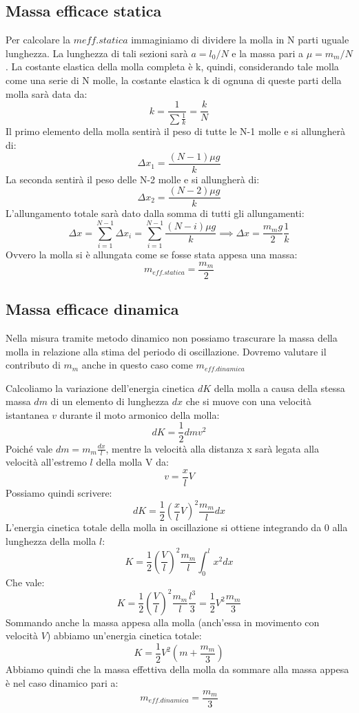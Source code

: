\documentclass[a4paper,12pt]{article}
\begin{document}
\subsection{Massa efficace statica}
Per calcolare la $m{eff.statica}$ immaginiamo di dividere la molla in N parti uguale lunghezza.
La lunghezza di tali sezioni sarà $a = l_0 / N$ e la massa pari a $\mu = m_m / N$.
La costante elastica della molla completa è k, quindi, considerando tale molla come una serie di N molle,
la costante elastica k di ognuna di queste parti della molla sarà data da:
$$
k = \frac{1}{\sum\frac{1}{k}} = \frac{k}{N}
$$
Il primo elemento della molla sentirà il peso di tutte le N-1 molle e si allungherà di:
$$
\Delta x_1 = \frac{(N-1)\mu g}{k} 
$$
La seconda sentirà il peso delle N-2 molle e si allungherà di:
$$
\Delta x_2 = \frac{(N-2)\mu g}{k} 
$$
L'allungamento totale sarà dato dalla somma di tutti gli allungamenti:
$$
\Delta x = \sum_{i=1}^{N-1} \Delta x_i = \sum_{i=1}^{N-1} \frac{(N-i)\mu g}{k} \implies \Delta x = \frac{m_m g}{2} \frac{1}{k}
$$
Ovvero la molla si è allungata come se fosse stata appesa una massa:
$$
m_{eff.statica} = \frac{m_m}{2}
$$

\subsection{Massa efficace dinamica}
Nella misura tramite metodo dinamico non possiamo trascurare la massa della molla in relazione alla stima del
periodo di oscillazione.
Dovremo valutare il contributo di $m_m$ anche in questo caso come $m_{eff.dinamica}$

Calcoliamo la variazione dell'energia cinetica $dK$ della molla a causa della stessa massa $dm$ di un 
elemento di lunghezza $dx$ che si muove con una velocità istantanea $v$ durante il moto armonico della molla:
$$
dK = \frac{1}{2}dmv^2
$$
Poiché vale $dm = m_m \frac{dx}{l}$, mentre la velocità alla distanza x sarà legata alla velocità all'estremo
$l$ della molla V da:
$$
v = \frac{x}{l}V
$$
Possiamo quindi scrivere:
$$
dK = \frac{1}{2}(\frac{x}{l}V)^2 \frac{m_m}{l}dx
$$
L'energia cinetica totale della molla in oscillazione si ottiene integrando da 0 alla lunghezza della molla $l$:
$$
K = \frac{1}{2}(\frac{V}{l})^2 \frac{m_m}{l} \int_{0}^{l} x^2 dx
$$
Che vale:
$$
K = \frac{1}{2}(\frac{V}{l})^2 \frac{m_m}{l} \frac{l^3}{3} = \frac{1}{2}V^2 \frac{m_m}{3}
$$
Sommando anche la massa appesa alla molla (anch'essa in movimento con velocità $V$) abbiamo un'energia
cinetica totale:
$$
K = \frac{1}{2}V^2 (m+\frac{m_m}{3})
$$
Abbiamo quindi che la massa effettiva della molla da sommare alla massa appesa è nel caso dinamico pari a:
$$
m_{eff.dinamica} = \frac{m_m}{3}
$$
\end{document}
